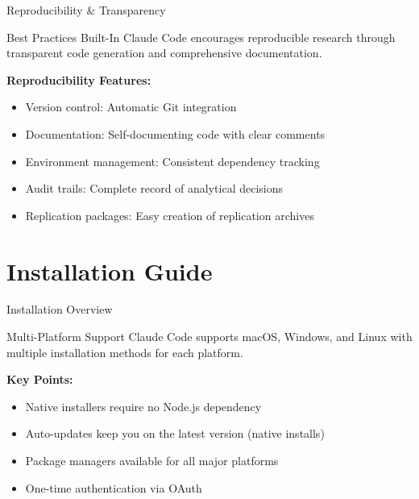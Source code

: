 \documentclass[9pt]{beamer}
\begin{document}
	\begin{frame}{Reproducibility \& Transparency}
		\begin{exampleblock}{Best Practices Built-In}
			Claude Code encourages reproducible research through transparent code generation and comprehensive documentation.
		\end{exampleblock}
		
		\vspace{0.5cm}
		
		\textbf{Reproducibility Features:}
		\begin{itemize}
			\item \alert{Version control:} Automatic Git integration
			\item \alert{Documentation:} Self-documenting code with clear comments
			\item \alert{Environment management:} Consistent dependency tracking
			\item \alert{Audit trails:} Complete record of analytical decisions
			\item \alert{Replication packages:} Easy creation of replication archives
		\end{itemize}
	\end{frame}
	
	\section{Installation Guide}
	
	\begin{frame}{Installation Overview}
		\begin{block}{Multi-Platform Support}
			Claude Code supports macOS, Windows, and Linux with multiple installation methods for each platform.
		\end{block}
		
		\vspace{0.5cm}
		
		\textbf{Key Points:}
		\begin{itemize}
			\item \alert{Native installers} require no Node.js dependency
			\item \alert{Auto-updates} keep you on the latest version (native installs)
			\item \alert{Package managers} available for all major platforms
			\item \alert{One-time authentication} via OAuth
		\end{itemize}
	\end{frame}
	
\end{document}
